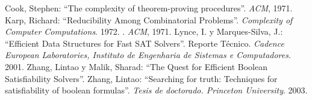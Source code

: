 \documentclass[12pt,lettersize,oneside]{article}
\begin{document}
\begin{thebibliography}{99}
Cook, Stephen: ``The complexity of theorem-proving
  procedures''. \emph{ACM}, 1971.
Karp, Richard: ``Reducibility Among Combinatorial
  Problems''. \emph{Complexity of Computer Computations}. 1972.
  . \emph{ACM}, 1971.
Lynce, I. y Marques-Silva, J.: ``Efficient Data Structures for
  Fast SAT Solvers''. Reporte Técnico. \emph{Cadence European Laboratories,
    Instituto de Engenharia de Sistemas e Computadores}. 2001.
Zhang, Lintao y Malik, Sharad: ``The Quest for Efficient Boolean
  Satisfiability Solvers''.
Zhang, Lintao: ``Searching for truth: Techniques for
  satisfiability of boolean formulas''. \emph{Tesis de doctorado. Princeton University}. 2003.
\end{thebibliography}
\end{document}
